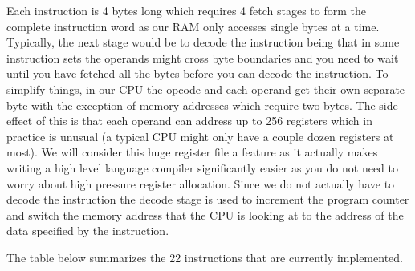 \documentclass[10pt]{article}
\begin{document}
        Each instruction is 4 bytes long which requires 4 fetch stages to form
        the complete instruction word as our RAM only accesses single bytes at
        a time.  Typically, the next stage would be to decode the instruction
        being that in some instruction sets the operands might cross byte
        boundaries and you need to wait until you have fetched all the bytes
        before you can decode the instruction. To simplify things, in our CPU
        the opcode and each operand get their own separate byte with the
        exception of memory addresses which require two bytes.  The side effect
        of this is that each operand can address up to 256 registers which in
        practice is unusual (a typical CPU might only have a couple dozen
        registers at most). We will consider this huge register file a feature
        as it actually makes writing a high level language compiler
        significantly easier as you do not need to worry about high pressure
        register allocation.  Since we do not actually have to decode the
        instruction the decode stage is used to increment the program counter
        and switch the memory address that the CPU is looking at to the address
        of the data specified by the instruction.

        \vspace{\baselineskip}
        The table below summarizes the 22 instructions that are currently
        implemented.
\end{document}
